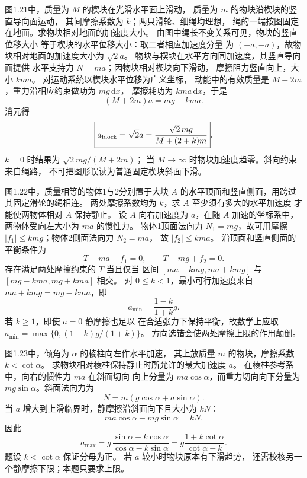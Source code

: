 图1.21中，质量为 $M$ 的楔块在光滑水平面上滑动，
质量为 $m$ 的物块沿楔块的竖直导向面运动，
其间摩擦系数为 $k$；两只滑轮、细绳均理想，
绳的一端按图固定在地面。求物块相对地面的加速度大小。
\exsolution
由图中绳长不变关系可见，物块的竖直位移大小
等于楔块的水平位移大小：取二者相应加速度分量
为 $(-a,-a)$，故物块相对地面的加速度大小为 $\sqrt2a$。
物块与楔块在水平方向同加速度，其竖直导向面提供
水平支持力 $N=ma$；因物块相对楔块向下滑动，
摩擦阻力竖直向上，大小 $kma$。
对运动系统以楔块水平位移为广义坐标，
动能中的有效质量是 $M+2m$，重力沿相应约束做功为 $mg\,\mathrm dx$，
摩擦耗功为 $kma\,\mathrm dx$，于是
\[
(M+2m)a=mg-kma.
\]
消元得
\[
\boxed{a_{\rm block}=\sqrt2 a
=\frac{\sqrt2\,mg}{M+(2+k)m}}.
\]
\excheck $k=0$ 时结果为 $\sqrt2mg/(M+2m)$；
当 $M\to\infty$ 时物块加速度趋零。斜向约束来自绳路，
不可把图形误读为普通固定楔块斜面下滑。

图1.22中，质量相等的物体1与2分别置于大块 $A$
的水平顶面和竖直侧面，用跨过其固定滑轮的绳相连。
两处摩擦系数均为 $k$，求 $A$ 至少须有多大的水平加速度
才能使两物体相对 $A$ 保持静止。
\exsolution
设 $A$ 向右加速度为 $a$，在随 $A$ 加速的坐标系中，
两物体受向左大小为 $ma$ 的惯性力。
物体1顶面法向力 $N_1=mg$，故可用摩擦
$|f_1|\le kmg$；物体2侧面法向力 $N_2=ma$，
故 $|f_2|\le kma$。
沿顶面和竖直侧面的平衡条件为
\[
T-ma+f_1=0,\qquad T-mg+f_2=0 .
\]
存在满足两处摩擦约束的 $T$ 当且仅当
区间 $[ma-kmg,ma+kmg]$ 与
$[mg-kma,mg+kma]$ 相交。
对 $0\le k<1$，最小可行加速度来自
$ma+kmg=mg-kma$，即
\[
\boxed{a_{\min}=\frac{1-k}{1+k}g}.
\]
\excheck 若 $k\ge1$，即使 $a=0$ 静摩擦也足以
在合适张力下保持平衡，故数学上应取
$a_{\min}=\max\{0,(1-k)g/(1+k)\}$。
方向选错会使两处摩擦上限的作用颠倒。

图1.23中，倾角为 $\alpha$ 的棱柱向左作水平加速，
其上放质量 $m$ 的物块，摩擦系数 $k<\cot\alpha$。
求物块相对棱柱保持静止时所允许的最大加速度 $a$。
\exsolution
在棱柱参考系中，向右的惯性力 $ma$ 在斜面切向
向上分量为 $ma\cos\alpha$，而重力切向向下分量为
$mg\sin\alpha$。斜面法向力为
\[
N=m(g\cos\alpha+a\sin\alpha).
\]
当 $a$ 增大到上滑临界时，静摩擦沿斜面向下且大小为 $kN$：
\[
ma\cos\alpha-mg\sin\alpha=kN.
\]
因此
\[
\boxed{a_{\max}
=g\,\frac{\sin\alpha+k\cos\alpha}
{\cos\alpha-k\sin\alpha}
=g\frac{1+k\cot\alpha}{\cot\alpha-k}}.
\]
\excheck 题设 $k<\cot\alpha$ 保证分母为正。
若 $a$ 较小时物块原本有下滑趋势，
还需校核另一个静摩擦下限；本题只要求上限。
